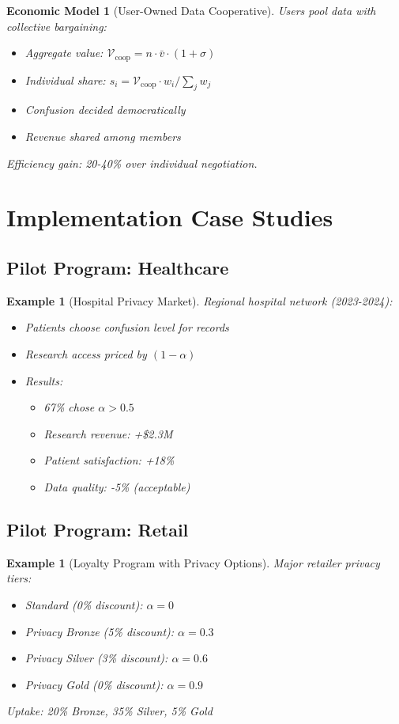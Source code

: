 \documentclass[11pt,final]{article}
\newcommand{\Value}{\mathcal{V}}
\newtheorem{example}[theorem]{Example}
\newtheorem{model}[theorem]{Economic Model}
\begin{document}
\begin{model}[User-Owned Data Cooperative]
Users pool data with collective bargaining:
\begin{itemize}
    \item Aggregate value: $\Value_{\text{coop}} = n \cdot \bar{v} \cdot (1 + \sigma)$
    \item Individual share: $s_i = \Value_{\text{coop}} \cdot w_i / \sum_j w_j$
    \item Confusion decided democratically
    \item Revenue shared among members
\end{itemize}

Efficiency gain: 20-40\% over individual negotiation.
\end{model}

\section{Implementation Case Studies}

\subsection{Pilot Program: Healthcare}

\begin{example}[Hospital Privacy Market]
Regional hospital network (2023-2024):
\begin{itemize}
    \item Patients choose confusion level for records
    \item Research access priced by $(1-\alpha)$
    \item Results:
    \begin{itemize}
        \item 67\% chose $\alpha > 0.5$
        \item Research revenue: +\$2.3M
        \item Patient satisfaction: +18\%
        \item Data quality: -5\% (acceptable)
    \end{itemize}
\end{itemize}
\end{example}

\subsection{Pilot Program: Retail}

\begin{example}[Loyalty Program with Privacy Options]
Major retailer privacy tiers:
\begin{itemize}
    \item Standard (0\% discount): $\alpha = 0$
    \item Privacy Bronze (5\% discount): $\alpha = 0.3$
    \item Privacy Silver (3\% discount): $\alpha = 0.6$
    \item Privacy Gold (0\% discount): $\alpha = 0.9$
\end{itemize}
Uptake: 20\% Bronze, 35\% Silver, 5\% Gold
\end{example}
\end{document}
